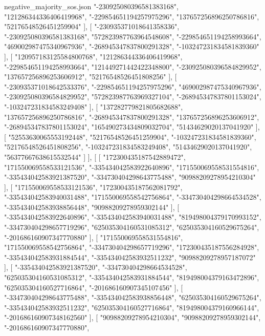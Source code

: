 \begin{filecontents*}[overwrite]{negative_majority_sos.json}
    "-230925080396581383168",
    "121286344336406419968",
    "-229854651194257975296",
    "137657256896250786816",
    "52176548526451259904"
   ],
   [
    "-230935371018641358336",
    "-230925080396581383168",
    "572823987763964548608",
    "-229854651194258993664",
    "469002987475340967936",
    "-268945347837800291328",
    "-103247231834581839360"
   ],
   [
    "120957183125584800768",
    "121286344336406419968",
    "-229854651194258993664",
    "121449271442422348800",
    "-230925080396584829952",
    "137657256896253606912",
    "52176548526451808256"
   ],
   [
    "-230935371018642533376",
    "-229854651194257975296",
    "469002987475340967936",
    "-230925080396584829952",
    "572823987763969327104",
    "-268945347837801153024",
    "-103247231834583249408"
   ],
   [
    "137282779821805682688",
    "137657256896250786816",
    "-268945347837800291328",
    "137657256896253606912",
    "-268945347837801153024",
    "165490273434809032704",
    "51434629020137041920"
   ],
   [
    "52553630065553192448",
    "52176548526451259904",
    "-103247231834581839360",
    "52176548526451808256",
    "-103247231834583249408",
    "51434629020137041920",
    "56377667638615532544"
   ]
  ],
  [
   [
    "172300435187542889472",
    "171550069558533121536",
    "-335434042583922640896",
    "171550069558531554816",
    "-335434042583921387520",
    "-334730404298643775488",
    "90988209278954210304"
   ],
   [
    "171550069558533121536",
    "172300435187562081792",
    "-335434042583940031488",
    "171550069558542756864",
    "-334730404298664534528",
    "-335434042583938856448",
    "90988209278959302144"
   ],
   [
    "-335434042583922640896",
    "-335434042583940031488",
    "819498004379170993152",
    "-334730404298657719296",
    "625035304160531085312",
    "625035304160529675264",
    "-201686160907347770880"
   ],
   [
    "171550069558531554816",
    "171550069558542756864",
    "-334730404298657719296",
    "172300435187556284928",
    "-335434042583931884544",
    "-335434042583932511232",
    "90988209278957187072"
   ],
   [
    "-335434042583921387520",
    "-334730404298664534528",
    "625035304160531085312",
    "-335434042583931884544",
    "819498004379163472896",
    "625035304160527716864",
    "-201686160907345107456"
   ],
   [
    "-334730404298643775488",
    "-335434042583938856448",
    "625035304160529675264",
    "-335434042583932511232",
    "625035304160527716864",
    "819498004379160966144",
    "-201686160907348162560"
   ],
   [
    "90988209278954210304",
    "90988209278959302144",
    "-201686160907347770880",

\end{filecontents*}

